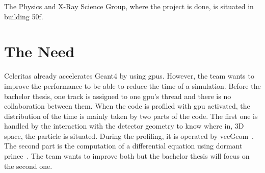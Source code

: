 The Physics and X-Ray Science Group, where the project is done, is situated in building 50f.


\section{The Need}
\label{spec:ch:context:need}

Celeritas already accelerates Geant4 by using \acrshort{gpu}s.
However, the team wants to improve the performance to be able to reduce the time of a simulation.
Before the bachelor thesis, one track is assigned to one \acrshort{gpu}'s thread and there is no collaboration between them.
When the code is profiled with \acrshort{gpu} activated, the distribution of the time is mainly taken by two parts of the code.
The first one is handled by the interaction with the detector geometry to know where in, 3D space, the particle is situated.
During the profiling, it is operated by vecGeom~\cite{VecGeom}.
The second part is the computation of a differential equation using dormant prince~\cite{princeDormand}.
The team wants to improve both but the bachelor thesis will focus on the second one.
